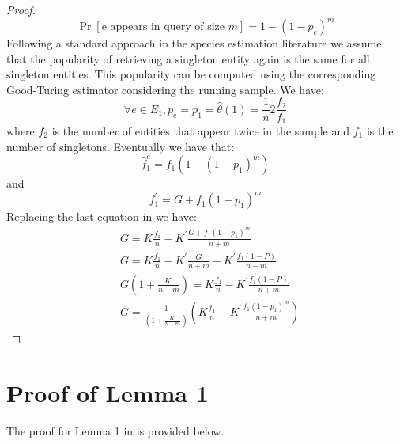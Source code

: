 \documentclass[conference]{IEEEtran}
\begin{document}
\begin{proof}
\begin{equation}
\Pr[\mbox{e appears in query of size $m$}] = 1 - (1-p_e)^m
\end{equation}
Following a standard approach in the species estimation literature we assume that the popularity of retrieving a singleton entity again is the same for all singleton entities. This popularity can be computed using the corresponding Good-Turing estimator considering the running sample. We have:
\begin{equation}
\forall e \in E_1, p_e = p_1 = \hat{\theta}(1) = \frac{1}{n}2\frac{f_2}{f_1}
\end{equation}
where $f_2$ is the number of entities that appear twice in the sample and $f_1$ is the number of singletons. 
Eventually we have that:
\begin{equation}
\hat{f}_1^c = f_1(1 - (1-p_1)^m)
\end{equation}
and
\begin{equation}
f^{\prime}_1 = G + f_1(1-p_1)^m
\end{equation}
Replacing the last equation in  we have:
\begin{align}
&G = K\frac{f_1}{n} - K^{\prime}\frac{G + f_1(1-p_1)^m}{n+m} \nonumber \\
&G = K\frac{f_1}{n} - K^{\prime}\frac{G}{n+m} - K^{\prime}\frac{f_1(1- P)}{n+m} \nonumber \\
&G(1 + \frac{K^{\prime}}{n+m}) = K\frac{f_1}{n} - K^{\prime}\frac{f_1(1- P)}{n+m} \nonumber \\
&G = \frac{1}{(1 + \frac{K^{\prime}}{n+m})}(K\frac{f_1}{n} - K^{\prime}\frac{f_1(1-p_1)^m}{n+m}) \nonumber
\end{align}
\end{proof}

\section{Proof of Lemma 1}
\label{sec:prle1}

The proof for Lemma 1 in  is provided below.
\end{document}
